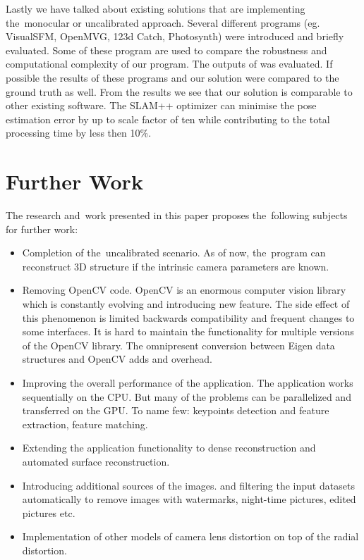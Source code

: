 Lastly we have talked about existing solutions that are implementing the~monocular or uncalibrated approach. Several different programs (eg. VisualSFM, OpenMVG, 123d Catch, Photosynth) were introduced and briefly evaluated. Some of these program are used to compare the robustness and computational complexity of our program. The outputs of  was evaluated. If possible the results of these programs and our solution were compared to the ground truth as well. From the results we see that our solution is comparable to other existing software. The SLAM++ optimizer can minimise the pose estimation error by up to scale factor of ten while contributing to the total processing time by less then 10\%. 

\section{Further Work}
The research and~work presented in this paper proposes the~following subjects for further work:
\begin{itemize}
	\item Completion of the~uncalibrated scenario. As of now, the~program can reconstruct 3D structure if the intrinsic camera parameters are known.
	
	\item Removing OpenCV code. OpenCV is an enormous computer vision library which is constantly evolving and introducing new feature. The side effect of this phenomenon is limited backwards compatibility and frequent changes to some interfaces. It is hard to maintain the functionality for multiple versions of the OpenCV library. The omnipresent conversion between Eigen data structures and OpenCV  adds and overhead.
	
	\item Improving the overall performance of the application. The application works sequentially on the CPU. But many of the problems can be parallelized and transferred on the GPU. To name few: keypoints detection and feature extraction, feature matching.
	
	\item Extending the application functionality to dense reconstruction and automated surface reconstruction.
	
	\item Introducing additional sources of the images. and filtering the input datasets automatically to remove images with watermarks, night-time pictures, edited pictures etc.
	
	\item Implementation of other models of camera lens distortion on top of the radial distortion.
\end{itemize}

